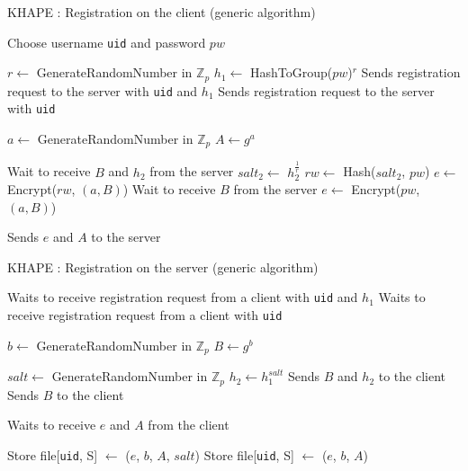 \documentclass[../report.tex]{subfiles}
\begin{document}
\begin{algorithm}
\caption{KHAPE : Registration on the client (generic algorithm)}
\label{register_login}
\begin{algorithmic}
\Require Choose username \verb|uid| and password $pw$

    \State $r \gets$ GenerateRandomNumber in $\mathbb{Z}_p$
    \State $h_1 \gets$ HashToGroup($pw$)$^r$
    \State Sends registration request to the server with \verb|uid| and $h_1$
\Else
    \State Sends registration request to the server with \verb|uid|
\EndIf

\State $a \gets$ GenerateRandomNumber in $\mathbb{Z}_p$
\State $A \gets g^a$

    \State Wait to receive $B$ and $h_2$ from the server
    \State $salt_2 \gets$ $h_2^{\frac{1}{r}}$
    \State $rw \gets$ Hash($salt_2$, $pw$)
    \State $e \gets$ Encrypt($rw$, $(a, B)$)
\Else
    \State Wait to receive $B$ from the server
    \State $e \gets$ Encrypt($pw$, $(a, B)$)
\EndIf

\State Sends $e$ and $A$ to the server


\end{algorithmic}
\end{algorithm}

\begin{algorithm}
\caption{KHAPE : Registration on the server (generic algorithm)}
\label{register_server}
\begin{algorithmic}
\Require 

    \State Waits to receive registration request from a client with \verb|uid| and $h_1$
\Else
    \State Waits to receive registration request from a client with \verb|uid|
\EndIf

\State $b \gets$ GenerateRandomNumber in $\mathbb{Z}_p$
\State $B \gets g^b$

    \State $salt \gets$ GenerateRandomNumber in $\mathbb{Z}_p$
    \State $h_2 \gets h_1^{salt}$    
    \State Sends $B$ and $h_2$ to the client
\Else
    \State Sends $B$ to the client
\EndIf

\State Waits to receive $e$ and $A$ from the client

    \State Store file[\verb|uid|, S] $\gets$ ($e$, $b$, $A$, $salt$) %
\Else
    \State Store file[\verb|uid|, S] $\gets$ ($e$, $b$, $A$) %
\EndIf

\end{algorithmic}
\end{algorithm}
\end{document}

